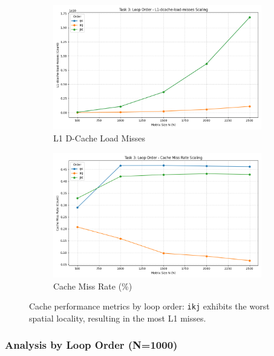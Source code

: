 \documentclass[11pt, a4paper]{article}
\begin{document}
\begin{figure}[h] %
    \centering
    \begin{subfigure}[b]{0.48\textwidth}
        \centering
        \includegraphics[width=\textwidth]{plots/task_3_loop_order_-__l1-dcache-load-misses.png}
        \caption{L1 D-Cache Load Misses}
        \label{fig:t3_l1_misses_order}
    \end{subfigure}
    \hfill
    \begin{subfigure}[b]{0.48\textwidth}
        \centering
        \includegraphics[width=\textwidth]{plots/task_3_loop_order_-__cache_miss_rate.png}
        \caption{Cache Miss Rate (\%)}
        \label{fig:t3_cache_miss_rate}
    \end{subfigure}
    \caption{Cache performance metrics by loop order: \texttt{ikj} exhibits the worst spatial locality, resulting in the most L1 misses.}
\end{figure}

\subsubsection{Analysis by Loop Order (N=1000)}
\end{document}
